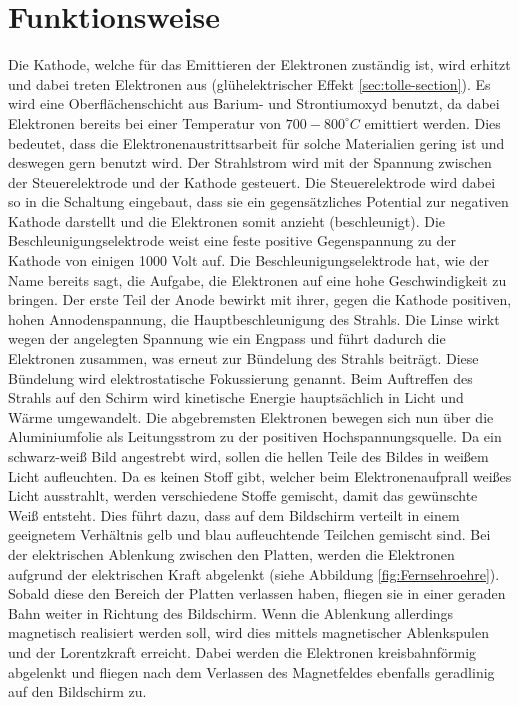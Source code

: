 \section{Funktionsweise}
\label{sec:Funktionsweise}
Die Kathode, welche für das Emittieren der Elektronen zuständig ist, wird erhitzt und dabei treten Elektronen aus (glühelektrischer Effekt \ref{sec:tolle-section}).
Es wird eine Oberflächenschicht aus Barium- und Strontiumoxyd benutzt, da  dabei Elektronen bereits bei einer Temperatur von $700-800 ^\circ C$ emittiert werden.
Dies bedeutet, dass die Elektronenaustrittsarbeit für solche Materialien gering ist und deswegen gern benutzt wird.
Der Strahlstrom wird mit der Spannung zwischen der Steuerelektrode und der Kathode gesteuert.
Die Steuerelektrode wird dabei so in die Schaltung eingebaut, dass sie ein gegensätzliches Potential zur negativen Kathode darstellt und die Elektronen somit anzieht (beschleunigt).
Die Beschleunigungselektrode weist eine feste positive Gegenspannung zu der Kathode von einigen 1000 Volt auf. 
Die Beschleunigungselektrode hat, wie der Name bereits sagt, die Aufgabe, die Elektronen auf eine hohe Geschwindigkeit zu bringen.
Der erste Teil der Anode bewirkt mit ihrer, gegen die Kathode positiven, hohen Annodenspannung, die Hauptbeschleunigung des Strahls.
Die Linse wirkt wegen der angelegten Spannung wie ein Engpass und führt dadurch die Elektronen zusammen, was erneut zur Bündelung des Strahls beiträgt.
Diese Bündelung wird elektrostatische Fokussierung genannt.
Beim Auftreffen des Strahls auf den Schirm wird kinetische Energie hauptsächlich in Licht und Wärme umgewandelt.
Die abgebremsten Elektronen bewegen sich nun über die Aluminiumfolie als Leitungsstrom zu der positiven Hochspannungsquelle.
Da ein schwarz-weiß Bild angestrebt wird, sollen die hellen Teile des Bildes in weißem Licht aufleuchten.
Da es keinen Stoff gibt, welcher beim Elektronenaufprall weißes Licht ausstrahlt, werden verschiedene Stoffe gemischt, damit das gewünschte Weiß entsteht.
Dies führt dazu, dass auf dem Bildschirm verteilt in einem geeignetem Verhältnis gelb und blau aufleuchtende Teilchen gemischt sind.
Bei der elektrischen Ablenkung zwischen den Platten, werden die Elektronen aufgrund der elektrischen Kraft abgelenkt (siehe Abbildung \ref{fig:Fernsehroehre}).
Sobald diese den Bereich der Platten verlassen haben, fliegen sie in einer geraden Bahn weiter in Richtung des Bildschirm.
Wenn die Ablenkung allerdings magnetisch realisiert werden soll, wird dies mittels magnetischer Ablenkspulen und der Lorentzkraft erreicht.
Dabei werden die Elektronen kreisbahnförmig abgelenkt und fliegen nach dem Verlassen des Magnetfeldes ebenfalls geradlinig auf den Bildschirm zu.

